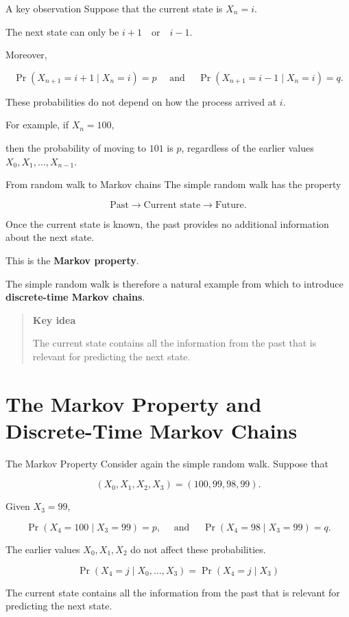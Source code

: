\documentclass[
  ignorenonframetext,
  aspectratio=169,
]{beamer}
\begin{document}
\begin{frame}{A key observation}
\protect{}\label{a-key-observation}
Suppose that the current state is \(X_n=i.\)

The next state can only be \(i+1 \quad\text{or}\quad i-1.\)

Moreover,

\[
\Pr(X_{n+1}=i+1\mid X_n=i)=p \quad \text{ and } \quad \Pr(X_{n+1}=i-1\mid X_n=i)=q.
\]

These probabilities do not depend on how the process arrived at \(i\).

For example, if \(X_n=100,\)

then the probability of moving to \(101\) is \(p\), regardless of the
earlier values \(X_0,X_1,\ldots,X_{n-1}.\)
\end{frame}

\begin{frame}{From random walk to Markov chains}
\protect{}\label{from-random-walk-to-markov-chains}
The simple random walk has the property

\[
\boxed{
\text{Past}
\longrightarrow
\text{Current state}
\longrightarrow
\text{Future}.
}
\]

Once the current state is known, the past provides no additional
information about the next state.

This is the \textbf{Markov property}.

The simple random walk is therefore a natural example from which to
introduce \textbf{discrete-time Markov chains}.

\begin{quote}
\textbf{Key idea}

The current state contains all the information from the past that is
relevant for predicting the next state.
\end{quote}
\end{frame}

\section{The Markov Property and Discrete-Time Markov
Chains}\label{the-markov-property-and-discrete-time-markov-chains}

\begin{frame}{The Markov Property}
\protect{}\label{the-markov-property}
Consider again the simple random walk. Suppose that

\[
(X_0,X_1,X_2,X_3)=(100,99,98,99).
\]

Given \(X_3=99\),

\[
\Pr(X_4=100\mid X_3=99)=p, \quad \text{ and } \quad \Pr(X_4=98\mid X_3=99)=q.
\]

The earlier values \(X_0,X_1,X_2\) do not affect these probabilities.

\[
\boxed{
\Pr(X_4=j\mid X_0,\ldots,X_3)
=\Pr(X_4=j\mid X_3)
}
\]

The current state contains all the information from the past that is
relevant for predicting the next state.
\end{frame}
\end{document}
